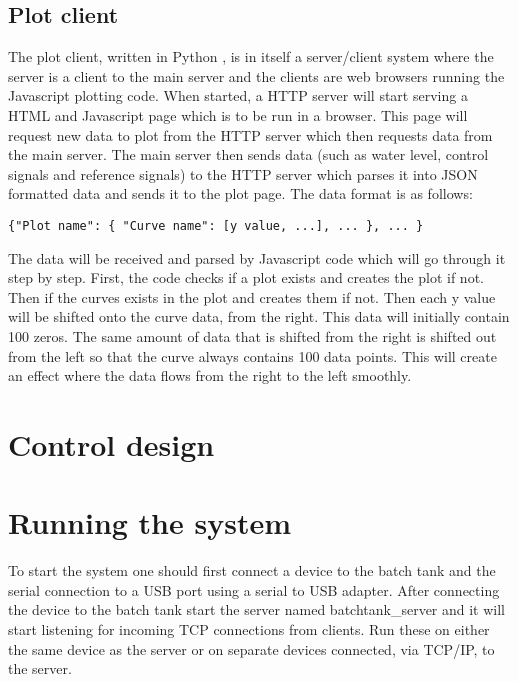 \documentclass{article}
\begin{document}
\subsection{Plot client}
The plot client, written in Python \cite{python}, is in itself a server/client
system where the server is a client to the main server and the clients are web
browsers running the Javascript plotting code. When started, a HTTP server will
start serving a HTML and Javascript page which is to be run in a browser. This
page will request new data to plot from the HTTP server which then requests data
from the main server. The main server then sends data (such as water level,
control signals and reference signals) to the HTTP server which parses it into
JSON \cite{json} formatted data and sends it to the plot page. The data format is
as follows:
\begin{verbatim}
{"Plot name": { "Curve name": [y value, ...], ... }, ... }
\end{verbatim}
The data will be received and parsed by Javascript code which will go through it
step by step. First, the code checks if a plot exists and creates the plot if
not. Then if the curves exists in the plot and creates them if not. Then each y
value will be shifted onto the curve data, from the right. This data will
initially contain 100 zeros. The same amount of data that is shifted from the
right is shifted out from the left so that the curve always contains 100
data points. This will create an effect where the data flows from the right to
the left smoothly.

\section{Control design}

\section{Running the system}
To start the system one should first connect a device to the batch tank and the
serial connection to a USB port using a serial to USB adapter. After connecting
the device to the batch tank start the server named batchtank\_server and it will
start listening for incoming TCP connections from clients. Run these on either
the same device as the server or on separate devices connected, via TCP/IP, to
the server.
\end{document}
